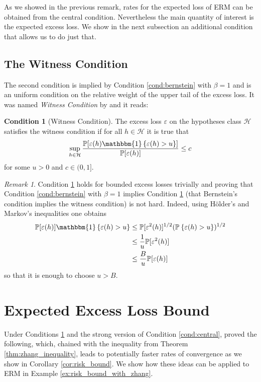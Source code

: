 \documentclass{uvamath}
\newcommand*{\calH}{\mathcal{H}}
\newcommand*{\bbP}{\mathbb{P}}
\newcommand*{\prob}[2][]{\mathbb{P}_{#1}\left\{#2\right\}}
\newcommand*{\indicator}[1]{\mathbbm{1}\left\{#1\right\}}
\theoremstyle{remark}
\newtheorem{remark}[theorem]{Remark}
\theoremstyle{definition}
\theoremstyle{definition}
\theoremstyle{definition}
\theoremstyle{definition}
\theoremstyle{definition}
\newtheorem{condition}{Condition}
\begin{document}
As we showed in the previous remark, rates for the expected loss of
ERM can be obtained from the central condition. Nevertheless the main
quantity of interest is the expected excess loss. We show in the next
subsection an additional condition that allows us to do just that.

\subsection{The Witness Condition}

The second condition is implied by Condition \ref{cond:bernstein} with
$\beta=1$ and is an uniform condition on the relative weight of the
upper tail of the excess loss. It was named \textit{Witness Condition}
by \citet{grunwald_fast_2016} and it reads:
\begin{condition}[Witness Condition]
  \label{cond:witness}
  The excess loss $\varepsilon$ on the hypotheses class $\calH$
  satisfies the witness condition if for all $h\in \calH$ it is true
  that
  \begin{equation*}
    \sup_{h\in\calH}
    \frac{\bbP[\varepsilon(h)\indicator{\varepsilon(h) > u}]}{\bbP[\varepsilon(h)]} \leq c
  \end{equation*}
  for some $u>0$ and $c\in(0,1]$.
\end{condition}
\begin{remark}
  Condition \ref{cond:witness} holds for bounded excess losses
  trivially and proving that Condition \ref{cond:bernstein} with
  $\beta = 1$ implies Condition \ref{cond:witness} (that Bernstein's
  condition implies the witness condition) is not hard. Indeed, using
  Hölder's and Markov's inequalities one obtains
  \begin{align*}
    \bbP[\varepsilon(h)]\indicator{\varepsilon(h) > u}
    &\leq \bbP[\varepsilon^2(h)]^{1/2}(\prob{\varepsilon(h) > u})^{1/2}\\
    &\leq \frac{1}{u}\bbP[\varepsilon^2(h)]\\
    &\leq \frac{B}{u}\bbP[\varepsilon(h)]
  \end{align*}
  so that it is enough to choose $u>B$.
\end{remark}

\section{Expected Excess Loss Bound \label{sect:fast_risk_bound}}

Under Conditions \ref{cond:witness} and the strong version of
Condition \ref{cond:central}, \citet[Lemma 16]{grunwald_fast_2016}
proved the following, which, chained with the inequality from Theorem
\ref{thm:zhang_inequality}, leads to potentially faster rates of
convergence as we show in Corollary \ref{cor:risk_bound}. We show how
these ideas can be applied to ERM in Example
\ref{ex:risk_bound_with_zhang}.
\end{document}

